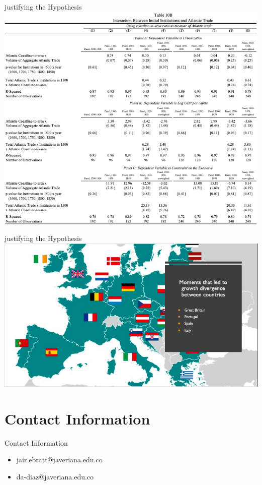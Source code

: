 \documentclass[pdftex,12pt,xcolor=pdftex,table]{beamer}
\theoremstyle{definition}
\theoremstyle{remark}
\numberwithin{equation}{section}
\numberwithin{figure}{section}
\begin{document}
		\begin{frame}{justifying the Hypothesis}
			\justifying
		    \centering
		    \includegraphics[scale=0.37]{pp13.png}
		\end{frame}
		\begin{frame}{justifying the Hypothesis}
			\justifying
		    \centering
		    \includegraphics[scale=0.45]{pp16.png}
		\end{frame}
	
		\section{Contact Information}
		\begin{frame}{Contact Information}
			\justifying
			\begin{itemize}
			    \item jair.ebratt@javeriana.edu.co
			    \vspace{11mm} 
			    \item da-diaz@javeriana.edu.co
			\end{itemize}
		\end{frame}	    
		
\end{document}
